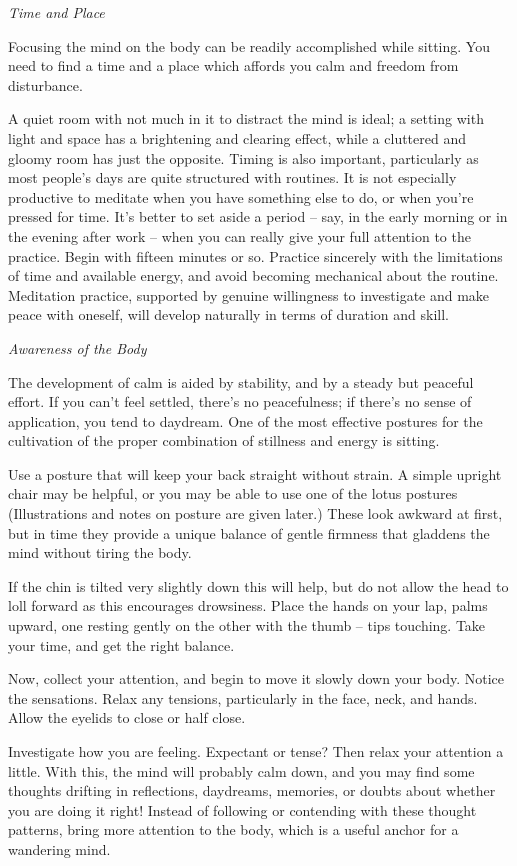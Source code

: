 \emph{Time and Place}

Focusing the mind on the body can be readily accomplished while sitting.
You need to find a time and a place which affords you calm and freedom
from disturbance.

A quiet room with not much in it to distract the mind is ideal; a
setting with light and space has a brightening and clearing effect,
while a cluttered and gloomy room has just the opposite. Timing is also
important, particularly as most people's days are quite structured with
routines. It is not especially productive to meditate when you have
something else to do, or when you're pressed for time. It's better to
set aside a period -- say, in the early morning or in the evening after
work -- when you can really give your full attention to the practice.
Begin with fifteen minutes or so. Practice sincerely with the
limitations of time and available energy, and avoid becoming mechanical
about the routine. Meditation practice, supported by genuine willingness
to investigate and make peace with oneself, will develop naturally in
terms of duration and skill.

\emph{Awareness of the Body}

The development of calm is aided by stability, and by a steady but
peaceful effort. If you can't feel settled, there's no peacefulness; if
there's no sense of application, you tend to daydream. One of the most
effective postures for the cultivation of the proper combination of
stillness and energy is sitting.

Use a posture that will keep your back straight without strain. A simple
upright chair may be helpful, or you may be able to use one of the lotus
postures (Illustrations and notes on posture are given later.) These
look awkward at first, but in time they provide a unique balance of
gentle firmness that gladdens the mind without tiring the body.

If the chin is tilted very slightly down this will help, but do not
allow the head to loll forward as this encourages drowsiness. Place the
hands on your lap, palms upward, one resting gently on the other with
the thumb -- tips touching. Take your time, and get the right balance.

Now, collect your attention, and begin to move it slowly down your body.
Notice the sensations. Relax any tensions, particularly in the face,
neck, and hands. Allow the eyelids to close or half close.

Investigate how you are feeling. Expectant or tense? Then relax your
attention a little. With this, the mind will probably calm down, and you
may find some thoughts drifting in reflections, daydreams, memories, or
doubts about whether you are doing it right! Instead of following or
contending with these thought patterns, bring more attention to the
body, which is a useful anchor for a wandering mind.

